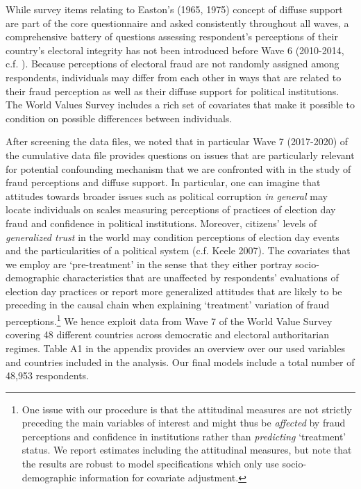 \documentclass[11pt, ngerman,english,a4]{article}
\begin{document}
While survey items relating to Easton's (1965, 1975) concept of diffuse support are part of the core questionnaire and asked consistently throughout all waves, a comprehensive battery of questions assessing respondent's perceptions of their country's electoral integrity has not been introduced before Wave 6 (2010-2014, c.f. \citealt{Norris2014}). Because perceptions of electoral fraud are not randomly assigned among respondents, individuals may differ from each other in ways that are related to their fraud perception as well as their diffuse support for political institutions. The World Values Survey includes a rich set of covariates that make it possible to condition on possible differences between individuals. 

After screening the data files, we noted that in particular Wave 7 (2017-2020) of the cumulative data file provides questions on issues that are particularly relevant for potential confounding mechanism that we are confronted with in the study of fraud perceptions and diffuse support. In particular, one can imagine that attitudes towards broader issues such as political corruption \textit{in general} may locate individuals on scales measuring perceptions of practices of election day fraud and confidence in political institutions. Moreover, citizens' levels of \textit{generalized trust} in the world may condition perceptions of election day events and the particularities of a political system (c.f. Keele 2007). The covariates that we employ are `pre-treatment' in the sense that they either portray socio-demographic characteristics that are unaffected by respondents' evaluations of election day practices or report more generalized attitudes that are likely to be preceding in the causal chain when explaining `treatment' variation of fraud perceptions.\footnote{One issue with our procedure is that the attitudinal measures are not strictly preceding the main variables of interest and might thus be \textit{affected} by fraud perceptions and confidence in institutions rather than \textit{predicting} `treatment' status. We report estimates including the attitudinal measures, but note that the results are robust to model specifications which only use socio-demographic information for covariate adjustment.} We hence exploit data from Wave 7 of the World Value Survey covering 48 different countries across democratic and electoral authoritarian regimes. Table A1 in the appendix provides an overview over our used variables and countries included in the analysis. Our final models include a total number of 48,953 respondents. 
\end{document}
